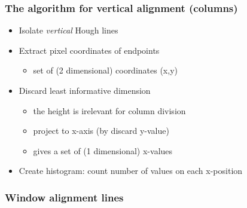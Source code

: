 \documentclass{beamer}
\begin{document}
\frame
{
	\frametitle{The algorithm for vertical alignment (columns)}
	\begin{itemize}
	\item <+-| alert@+> Isolate \emph{vertical} Hough lines
	\item <+-| alert@+> Extract pixel coordinates of endpoints 
		\begin{itemize}
		\item <+-| alert@+> set of (2 dimensional) coordinates (x,y)
		\end{itemize}
	\item <+-| alert@+> Discard least informative dimension
		\begin{itemize}
		\item <+-| alert@+> the height is irelevant for column division
		\item <+-| alert@+> project to x-axis (by discard y-value) 
		\item <+-| alert@+> gives a set of (1 dimensional) x-values 
		\end{itemize}
	\item <+-| alert@+> Create histogram: count number of values on each x-position
	\end{itemize}
}

\frame
{
	\frametitle{Window alignment lines}
}
\end{document}
